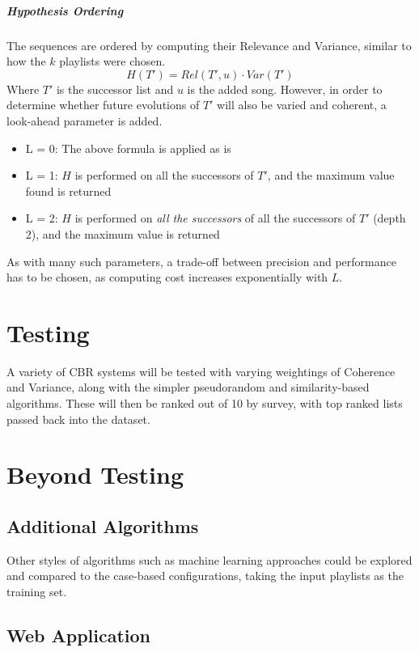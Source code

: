 \documentclass[a4paper, 12pt]{report}
\begin{document}
\paragraph{Hypothesis Ordering}
The sequences are ordered by computing their Relevance and Variance, similar to how the \(k\) playlists were chosen. 
\[H(T') = Rel(T', u) \cdot Var(T')\]
Where \(T'\) is the successor list and \(u\) is the added song. 
However, in order to determine whether future evolutions of \(T'\) will also be varied and coherent, a look-ahead parameter is added.
\begin{itemize}
    \item L = 0: The above formula is applied as is
    \item L = 1: \(H\) is performed on all the successors of \(T'\), and the maximum value found is returned 
    \item L = 2: \(H\) is performed on \emph{all the successors} of all the successors of \(T'\) (depth 2), and the maximum value is returned
\end{itemize}
As with many such parameters, a trade-off between precision and performance has to be chosen, as computing cost increases exponentially with \(L\).



\chapter{Testing}
A variety of CBR systems will be tested with varying weightings of Coherence and Variance, along with the simpler pseudorandom and similarity-based algorithms.
These will then be ranked out of 10 by survey, with top ranked lists passed back into the dataset.



\chapter{Beyond Testing}

\section{Additional Algorithms}
Other styles of algorithms such as machine learning approaches could be explored and compared to the case-based configurations, taking the input playlists as the training set.

\section{Web Application} \label{chap:webapp}
\end{document}

